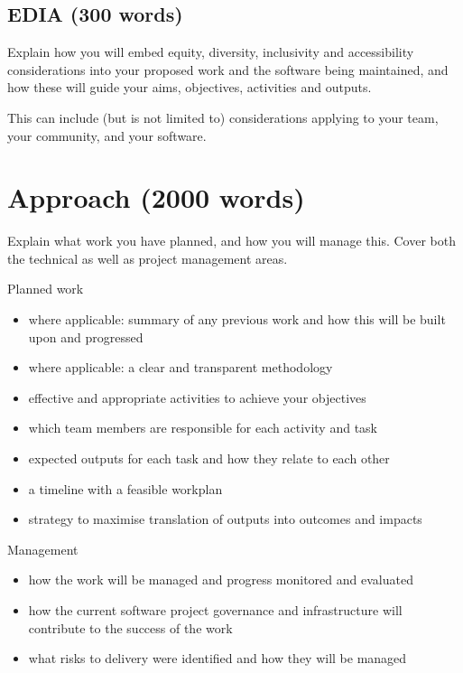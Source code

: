 \documentclass[12pt]{article}
\newenvironment{instruction}{%
    \begin{tcolorbox}[colback=red!5,colframe=red,title=Instruction]%
}{%
    \end{tcolorbox}%
}
\begin{document}


\subsection{EDIA (300 words)}

\begin{instruction}
Explain how you will embed equity, diversity, inclusivity and accessibility considerations into your proposed work and the software being maintained, and how these will guide your aims, objectives, activities and outputs.

This can include (but is not limited to) considerations applying to your team, your community, and your software.
\end{instruction}

\pagebreak

\section{Approach (2000 words)}

\begin{instruction}

Explain what work you have planned, and how you will manage this. Cover both the technical as well as project management areas.

Planned work

    \begin{itemize}
        \item where applicable: summary of any previous work and how this will be built upon and progressed
        \item where applicable: a clear and transparent methodology
        \item effective and appropriate activities to achieve your objectives
        \item which team members are responsible for each activity and task
        \item expected outputs for each task and how they relate to each other
        \item a timeline with a feasible workplan
        \item strategy to maximise translation of outputs into outcomes and impacts
    \end{itemize}

Management

    \begin{itemize}
        \item how the work will be managed and progress monitored and evaluated
        \item how the current software project governance and infrastructure will contribute to the success of the work
        \item what risks to delivery were identified and how they will be managed
    \end{itemize}


\end{instruction}
\end{document}
